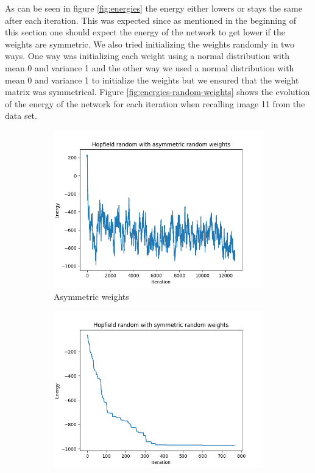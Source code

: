 \documentclass[a4paper]{article}
\begin{document}
As can be seen in figure \ref{fig:energies} the energy either lowers or stays the same after each iteration. This was expected since as mentioned in the beginning of this section one should expect the energy of the network to get lower if the weights are symmetric. We also tried initializing the weights randomly in two ways. One way was initializing each weight using a normal distribution with mean 0 and variance 1 and the other way we used a normal distribution with mean 0 and variance 1 to initialize the weights but we ensured that the weight matrix was symmetrical. Figure \ref{fig:energies-random-weights} shows the evolution of the energy of the network for each iteration when recalling image 11 from the data set.

\begin{figure}[!htb]
    \centering
    \begin{subfigure}[b]{0.48\textwidth}
        \includegraphics[width=\textwidth]{Labs/Lab 3/images/energies-asymmetric.png}
        \caption{Asymmetric weights}
    \end{subfigure}%
    \hfill
    \begin{subfigure}[b]{0.48\textwidth}
        \centering
        \includegraphics[width=\textwidth]{Labs/Lab 3/images/energies-symmetric.png}

\end{subfigure}
\end{figure}
\end{document}
